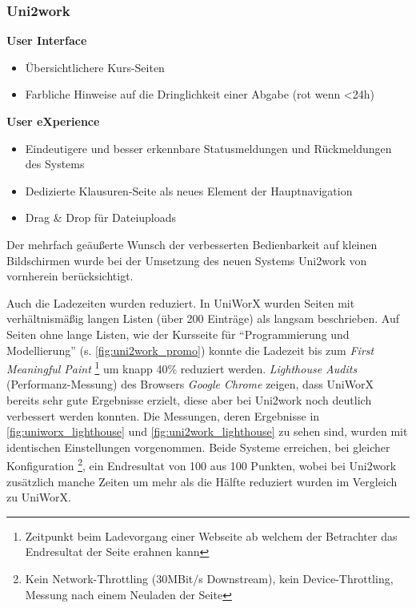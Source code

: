 \documentclass[11pt,a4paper,twoside,ngerman]{article}
\begin{document}
\subsubsection*{Uni2work}
\hspace{6mm}\textbf{User Interface}
\begin{itemize}
    \item Übersichtlichere Kurs-Seiten
    \item Farbliche Hinweise auf die Dringlichkeit einer Abgabe (rot wenn <24h)
\end{itemize}
    
\noindent\hspace{6mm}\textbf{User eXperience}
\begin{itemize}
    \item Eindeutigere und besser erkennbare Statusmeldungen und Rückmeldungen des Systems
    \item Dedizierte Klausuren-Seite als neues Element der Hauptnavigation
    \item Drag \& Drop für Dateiuploads
\end{itemize}

\noindent
Der mehrfach geäußerte Wunsch der verbesserten Bedienbarkeit auf kleinen Bildschirmen wurde bei der Umsetzung des neuen Systems Uni2work von vornherein berücksichtigt.

Auch die Ladezeiten wurden reduziert. In UniWorX wurden Seiten mit verhältnismäßig langen Listen (über 200 Einträge) als langsam beschrieben. 
Auf Seiten ohne lange Listen, wie der Kursseite für "`Programmierung und Modellierung"' (s. \autoref{fig:uni2work_promo}) konnte die Ladezeit bis zum \textit{First Meaningful Paint} \footnote{Zeitpunkt beim Ladevorgang einer Webseite ab welchem der Betrachter das Endresultat der Seite erahnen kann} um knapp 40\% reduziert werden.
\textit{Lighthouse Audits} (Performanz-Messung) des Browsers \textit{Google Chrome} zeigen, dass UniWorX bereits sehr gute Ergebnisse erzielt, diese aber bei Uni2work noch deutlich verbessert werden konnten. Die Messungen, deren Ergebnisse in \autoref{fig:uniworx_lighthouse} und \autoref{fig:uni2work_lighthouse} zu sehen sind, wurden mit identischen Einstellungen vorgenommen. Beide Systeme erreichen, bei gleicher Konfiguration \footnote{Kein Network-Throttling (30MBit/s Downstream), kein Device-Throttling, Messung nach einem Neuladen der Seite}, ein Endresultat von 100 aus 100 Punkten, wobei bei Uni2work zusätzlich manche Zeiten um mehr als die Hälfte reduziert wurden im Vergleich zu UniWorX.
\end{document}
